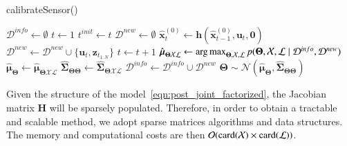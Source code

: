 \begin{algorithm}[ht]
\caption{calibrateSensor()}
\label{alg:calibration}
{}
\vskip 0.2cm
$\mathcal{D}^{info}\leftarrow\emptyset$ \;
$t\leftarrow1$ \;
 {
   \;
  $t^{init} \leftarrow t$ \;
  $\mathcal{D}^{new}\leftarrow\emptyset$ \;
   {
    $\hat{\mathbf{x}}_t^{(0)} \leftarrow
      \mathbf{h}(\hat{\mathbf{x}}_{t-1}^{(0)},\mathbf{u}_t,\mathbf{0})$ \;
    $\mathcal{D}^{new}\leftarrow\mathcal{D}^{new}\cup\{\mathbf{u}_t,
      \mathbf{z}_{t_{1:N}}\}$ \;
    $t \leftarrow t + 1$ \;
  }
   \;
  $\hat{\boldsymbol{\mu}}_{\boldsymbol{\Theta}\mathcal{X}\mathcal{L}} \leftarrow
    \operatorname*{arg\,max}_{\boldsymbol{\Theta},\mathcal{X},\mathcal{L}}
    p(\boldsymbol{\Theta}, \mathcal{X},\mathcal{L} \mid\mathcal{D}^{info},
    \mathcal{D}^{new})$ \;
   \;
  $\hat{\boldsymbol{\mu}}_{\boldsymbol{\Theta}}\leftarrow
    \hat{\boldsymbol{\mu}}_{\boldsymbol{\Theta}\mathcal{X}\mathcal{L}}$ \;
  $\hat{\boldsymbol{\Sigma}}_{\boldsymbol{\Theta}\boldsymbol{\Theta}}\leftarrow
    \hat{\boldsymbol{\Sigma}}_{\boldsymbol{\Theta}\mathcal{X}\mathcal{L}}$ \;
   \;
   {
    $\mathcal{D}^{info}\leftarrow\mathcal{D}^{info}\cup\mathcal{D}^{new}$ \;
    $\boldsymbol{\Theta}\sim\mathcal{N}(
      \hat{\boldsymbol{\mu}}_{\boldsymbol{\Theta}},
      \hat{\boldsymbol{\Sigma}}_{\boldsymbol{\Theta}\boldsymbol{\Theta}})$ \;
  }
}
\end{algorithm}

Given the structure of the model~\eqref{eqn:post_joint_factorized}, the
Jacobian matrix $\mathbf{H}$ will be sparsely populated. Therefore, in order to
obtain a tractable and scalable method, we adopt sparse matrices algorithms and
data structures. The memory and computational costs are then
$\mathcal{O}(\operatorname{card}(\mathcal{X})\times\operatorname{card}(\mathcal{L}))$.
